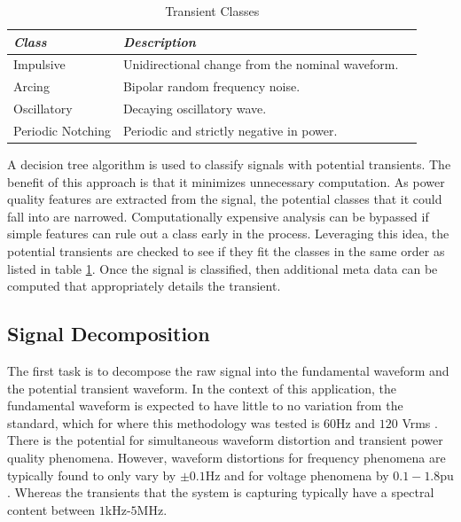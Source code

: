 \documentclass[10pt,conference,compsocconf]{IEEEtran}
\begin{document}
%
\begin{table}[htbp]
\caption{Transient Classes}\label{TransientClasses}
\centering%
\begin{tabular}{lll}
\hline
\textit{Class} & \textit{Description} \\
\hline
Impulsive & Unidirectional change from the nominal waveform. \\
Arcing & Bipolar random frequency noise. \\
Oscillatory & Decaying oscillatory wave. \\
Periodic Notching & Periodic and strictly negative in power. \\
\hline
\end{tabular}
\end{table}
%

A decision tree algorithm is used to classify signals with potential transients. The benefit of this approach is that it minimizes unnecessary computation. As power quality features are extracted from the signal, the potential classes that it could fall into are narrowed. Computationally expensive analysis can be bypassed if simple features can rule out a class early in the process. Leveraging this idea, the potential transients are checked to see if they fit the classes in the same order as listed in table \ref{TransientClasses}. Once the signal is classified, then additional meta data can be computed that appropriately details the transient.

\subsection{Signal Decomposition}

The first task is to decompose the raw signal into the fundamental waveform and the potential transient waveform. In the context of this application, the fundamental waveform is expected to have little to no variation from the standard, which for where this methodology was tested is $60$Hz and $120$ Vrms \cite{ANSI:2016:C84.1-2016}. There is the potential for simultaneous waveform distortion and transient power quality phenomena. However, waveform distortions for frequency phenomena are typically found to only vary by $\pm 0.1$Hz and for voltage phenomena by $0.1-1.8$pu \cite{IEEE:2018:1159D3}. Whereas the transients that the system is capturing typically have a spectral content between $1$kHz-$5$MHz. 
\end{document}
